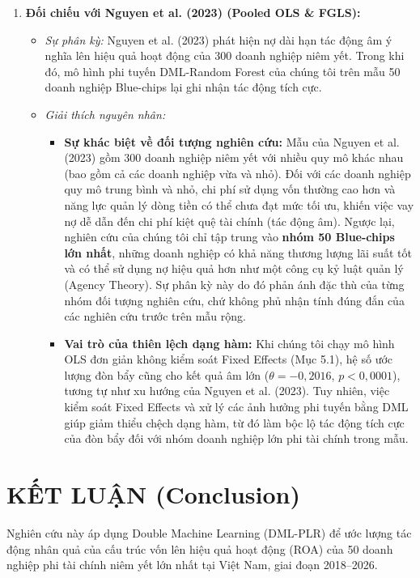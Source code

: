 \documentclass[12pt,a4paper]{article}
\begin{document}
\begin{enumerate}
    \item \textbf{Đối chiếu với Nguyen et al. (2023) (Pooled OLS \& FGLS):}
    \begin{itemize}
        \item \textit{Sự phân kỳ:} Nguyen et al. (2023) phát hiện nợ dài hạn tác động âm ý nghĩa lên hiệu quả hoạt động của 300 doanh nghiệp niêm yết. Trong khi đó, mô hình phi tuyến DML-Random Forest của chúng tôi trên mẫu 50 doanh nghiệp Blue-chips lại ghi nhận tác động tích cực.
        \item \textit{Giải thích nguyên nhân:}
        \begin{itemize}
            \item \textbf{Sự khác biệt về đối tượng nghiên cứu:} Mẫu của Nguyen et al. (2023) gồm 300 doanh nghiệp niêm yết với nhiều quy mô khác nhau (bao gồm cả các doanh nghiệp vừa và nhỏ). Đối với các doanh nghiệp quy mô trung bình và nhỏ, chi phí sử dụng vốn thường cao hơn và năng lực quản lý dòng tiền có thể chưa đạt mức tối ưu, khiến việc vay nợ dễ dẫn đến chi phí kiệt quệ tài chính (tác động âm). Ngược lại, nghiên cứu của chúng tôi chỉ tập trung vào \textbf{nhóm 50 Blue-chips lớn nhất}, những doanh nghiệp có khả năng thương lượng lãi suất tốt và có thể sử dụng nợ hiệu quả hơn như một công cụ kỷ luật quản lý (Agency Theory). Sự phân kỳ này do đó phản ánh đặc thù của từng nhóm đối tượng nghiên cứu, chứ không phủ nhận tính đúng đắn của các nghiên cứu trước trên mẫu rộng.
            \item \textbf{Vai trò của thiên lệch dạng hàm:} Khi chúng tôi chạy mô hình OLS đơn giản không kiểm soát Fixed Effects (Mục 5.1), hệ số ước lượng đòn bẩy cũng cho kết quả âm lớn ($\theta = -0,2016$, $p < 0,0001$), tương tự như xu hướng của Nguyen et al. (2023). Tuy nhiên, việc kiểm soát Fixed Effects và xử lý các ảnh hưởng phi tuyến bằng DML giúp giảm thiểu chệch dạng hàm, từ đó làm bộc lộ tác động tích cực của đòn bẩy đối với nhóm doanh nghiệp lớn phi tài chính trong mẫu.
        \end{itemize}
    \end{itemize}
\end{enumerate}

\section{KẾT LUẬN (Conclusion)}
Nghiên cứu này áp dụng Double Machine Learning (DML-PLR) để ước lượng tác động nhân quả của cấu trúc vốn lên hiệu quả hoạt động (ROA) của 50 doanh nghiệp phi tài chính niêm yết lớn nhất tại Việt Nam, giai đoạn 2018--2026.
\end{document}
